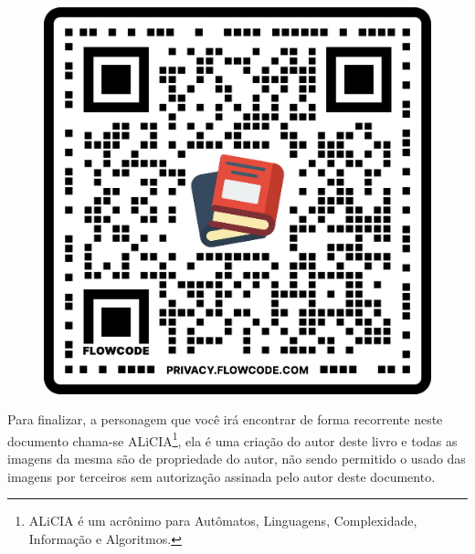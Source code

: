\

\begin{figure}[h]
	\centering
	\includegraphics[width=0.2\linewidth]{fig/qrcode}
\end{figure}

Para finalizar, a personagem que você irá encontrar de forma recorrente neste documento chama-se ALiCIA\footnote{ALiCIA é um acrônimo para Autômatos, Linguagens, Complexidade, Informação e Algoritmos.}, ela é uma criação do autor deste livro e todas as imagens da mesma são de propriedade do autor, não sendo permitido o usado das imagens por terceiros sem autorização assinada pelo autor deste documento.

\endgroup
\newpage
